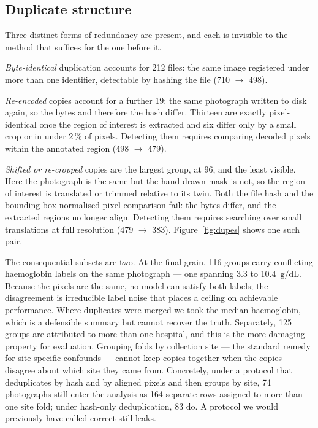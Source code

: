 \documentclass[11pt,a4paper]{article}
\newcommand{\gdl}{\ensuremath{\mathrm{g/dL}}}
\begin{document}
\subsection{Duplicate structure}

Three distinct forms of redundancy are present, and each is invisible to the method that
suffices for the one before it.

\emph{Byte-identical} duplication accounts for 212 files: the same image registered under more
than one identifier, detectable by hashing the file (710 $\to$ 498).

\emph{Re-encoded} copies account for a further 19: the same photograph written to disk again,
so the bytes and therefore the hash differ. Thirteen are exactly pixel-identical once the
region of interest is extracted and six differ only by a small crop or in under 2\,\% of
pixels. Detecting them requires comparing decoded pixels within the annotated region
(498 $\to$ 479).

\emph{Shifted or re-cropped} copies are the largest group, at 96, and the least visible. Here
the photograph is the same but the hand-drawn mask is not, so the region of interest is
translated or trimmed relative to its twin. Both the file hash and the bounding-box-normalised
pixel comparison fail: the bytes differ, and the extracted regions no longer align. Detecting
them requires searching over small translations at full resolution (479 $\to$ 383).
Figure~\ref{fig:dupes} shows one such pair.

The consequential subsets are two. At the final grain, 116 groups carry conflicting haemoglobin
labels on the same photograph --- one spanning 3.3 to 10.4~\gdl. Because the pixels are the
same, no model can satisfy both labels; the disagreement is irreducible label noise that places
a ceiling on achievable performance. Where duplicates were merged we took the median
haemoglobin, which is a defensible summary but cannot recover the truth. Separately, 125 groups
are attributed to more than one hospital, and this is the more damaging property for evaluation.
Grouping folds by collection site --- the standard remedy for site-specific confounds --- cannot
keep copies together when the copies disagree about which site they came from. Concretely, under a
protocol that deduplicates by hash and by aligned pixels and then groups by site, 74 photographs
still enter the analysis as 164 separate rows assigned to more than one site fold; under hash-only
deduplication, 83 do. A protocol we would previously have called correct still leaks.
\end{document}
